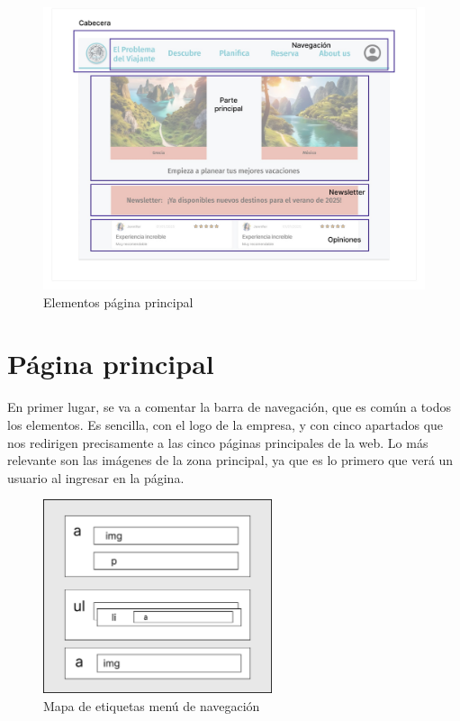 \documentclass[11pt, a4paper]{book}
\begin{document}
	
	\begin{figure} [H]
		\centering
		\includegraphics[width=\textwidth]{HTML/Doc-principal.jpg}
		\caption{Elementos página principal}
	\end{figure}

    \section{Página principal}

	En primer lugar, se va a comentar la barra de navegación, que es común a todos los elementos. Es sencilla, con el logo de la empresa, y con cinco apartados que nos redirigen precisamente a las cinco páginas principales de la web. Lo más relevante son las imágenes de la zona principal, ya que es lo primero que verá un usuario al ingresar en la página. 
	
	\begin{figure} [H]
		\centering
		\includegraphics[width=0.6\textwidth]{HTML/Etiq-nav.jpg}
		\caption{Mapa de etiquetas menú de navegación}
	\end{figure}
	
\end{document}
